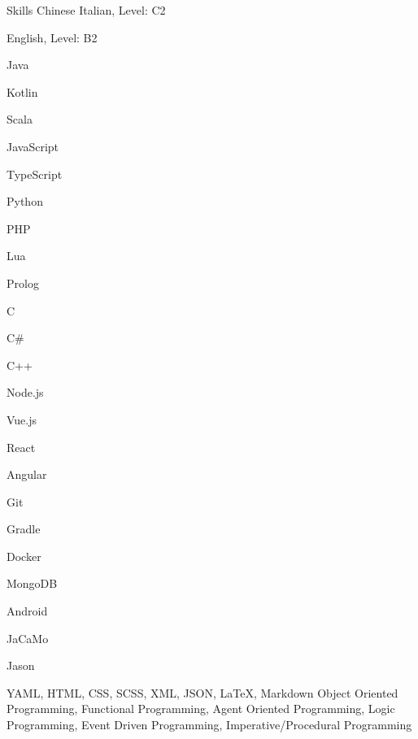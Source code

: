 
\begin{rubric}{Skills}
 Chinese
 Italian, Level: C2
        \par English, Level: B2

%
    \begin{multicols}{3} 
    \par Java
    \par Kotlin
    \par Scala
    \par JavaScript
    \par TypeScript
    \par Python
    \par PHP
    \par Lua
    \par Prolog
    \par C
    \par C\#
    \par C++
    \end{multicols}
%
    \begin{multicols}{3} 
    \par Node.js
    \par Vue.js
    \par React
    \par Angular
    \par Git
    \par Gradle
    \par Docker
    \par MongoDB
    \par Android
    \par JaCaMo
    \par Jason
    \end{multicols}
%
 YAML, HTML, CSS, SCSS, XML, JSON, \LaTeX, Markdown
%
 Object Oriented Programming, Functional Programming, Agent Oriented Programming, Logic Programming, Event Driven Programming,
Imperative/Procedural Programming
%
\end{rubric}